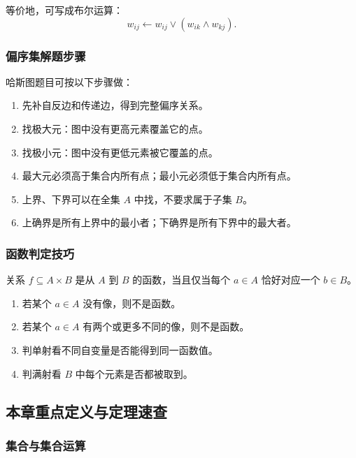 等价地，可写成布尔运算：
\[
w_{ij}\leftarrow w_{ij}\lor(w_{ik}\land w_{kj}).
\]

\subsubsection{偏序集解题步骤}

哈斯图题目可按以下步骤做：
\begin{enumerate}
	\item 先补自反边和传递边，得到完整偏序关系。
	\item 找极大元：图中没有更高元素覆盖它的点。
	\item 找极小元：图中没有更低元素被它覆盖的点。
	\item 最大元必须高于集合内所有点；最小元必须低于集合内所有点。
	\item 上界、下界可以在全集 \(A\) 中找，不要求属于子集 \(B\)。
	\item 上确界是所有上界中的最小者；下确界是所有下界中的最大者。
\end{enumerate}

\subsubsection{函数判定技巧}

关系 \(f\subseteq A\times B\) 是从 \(A\) 到 \(B\) 的函数，当且仅当每个 \(a\in A\) 恰好对应一个 \(b\in B\)。
\begin{enumerate}
	\item 若某个 \(a\in A\) 没有像，则不是函数。
	\item 若某个 \(a\in A\) 有两个或更多不同的像，则不是函数。
	\item 判单射看不同自变量是否能得到同一函数值。
	\item 判满射看 \(B\) 中每个元素是否都被取到。
\end{enumerate}

\subsection{本章重点定义与定理速查}

\subsubsection{集合与集合运算}

